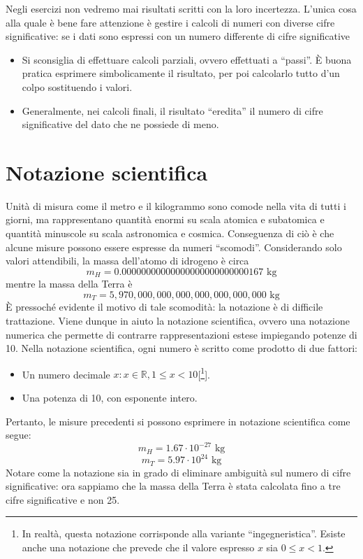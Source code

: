 Negli esercizi non vedremo mai risultati scritti con la loro incertezza. L'unica
cosa alla quale è bene fare attenzione è gestire i calcoli di numeri con diverse cifre
significative: se i dati sono espressi con un numero differente di cifre significative
\begin{itemize}
    \item Si sconsiglia di effettuare calcoli parziali, ovvero effettuati a ``passi''.
    È buona pratica esprimere simbolicamente il risultato, per poi calcolarlo tutto d'un
    colpo sostituendo i valori.

    \item Generalmente, nei calcoli finali, il risultato ``eredita'' il numero di cifre
    significative del dato che ne possiede di meno.
\end{itemize}

\section{Notazione scientifica}
Unità di misura come il metro e il kilogrammo sono comode nella vita di tutti i
giorni, ma rappresentano quantità enormi su scala atomica e subatomica e quantità
minuscole su scala astronomica e cosmica. Conseguenza di ciò è che alcune misure
possono essere espresse da numeri ``scomodi''. Considerando solo valori attendibili,
la massa dell'atomo di idrogeno è circa
\[ m_H = 0.000 000 000 000 000 000 000 000 001 67 \text{ kg} \]
mentre la massa della Terra è
\[ m_T = 5,970,000,000,000,000,000,000,000 \text{ kg} \]
È pressoché evidente il motivo di tale scomodità: la notazione è di difficile
trattazione. Viene dunque in aiuto la notazione scientifica, ovvero una
notazione numerica che permette di contrarre rappresentazioni estese impiegando
potenze di 10. Nella notazione scientifica, ogni numero è scritto come prodotto
di due fattori:
\begin{itemize}
    \item Un numero decimale $x:x\in \mathbb{R}, 1\leq x < 10$[\footnote{In realtà, questa notazione corrisponde alla variante ``ingegneristica''. Esiste anche una notazione che prevede che il valore espresso $x$ sia $0\leq x < 1$.}].
    \item Una potenza di 10, con esponente intero.
\end{itemize}
Pertanto, le misure precedenti si possono esprimere in notazione scientifica come
segue:
\[ m_H = 1.67 \cdot 10^{-27} \text{ kg} \]
\[ m_T = 5.97 \cdot 10^{24} \text{ kg}\]
Notare come la notazione sia in grado di eliminare ambiguità sul numero di cifre
significative: ora sappiamo che la massa della Terra è stata calcolata fino a
tre cifre significative e non 25.

